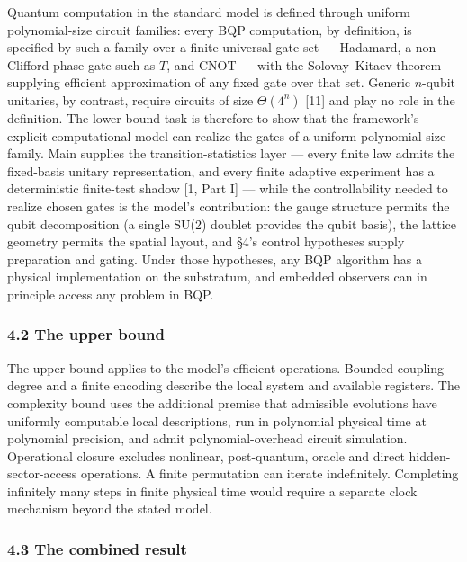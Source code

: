 \documentclass[
]{article}
\begin{document}
Quantum computation in the standard model is defined through uniform
polynomial-size circuit families: every BQP computation, by definition,
is specified by such a family over a finite universal gate set ---
Hadamard, a non-Clifford phase gate such as \(T\), and CNOT --- with the
Solovay--Kitaev theorem supplying efficient approximation of any fixed
gate over that set. Generic \(n\)-qubit unitaries, by contrast, require
circuits of size \(\Theta(4^n)\) {[}11{]} and play no role in the
definition. The lower-bound task is therefore to show that the
framework's explicit computational model can realize the gates of a
uniform polynomial-size family. Main supplies the transition-statistics
layer --- every finite law admits the fixed-basis unitary
representation, and every finite adaptive experiment has a deterministic
finite-test shadow {[}1, Part I{]} --- while the controllability needed
to realize chosen gates is the model's contribution: the gauge structure
permits the qubit decomposition (a single SU(2) doublet provides the
qubit basis), the lattice geometry permits the spatial layout, and §4's
control hypotheses supply preparation and gating. Under those
hypotheses, any BQP algorithm has a physical implementation on the
substratum, and embedded observers can in principle access any problem
in BQP.

\hypertarget{the-upper-bound}{%
\subsubsection{4.2 The upper bound}\label{the-upper-bound}}

The upper bound applies to the model's efficient operations. Bounded
coupling degree and a finite encoding describe the local system and
available registers. The complexity bound uses the additional premise
that admissible evolutions have uniformly computable local descriptions,
run in polynomial physical time at polynomial precision, and admit
polynomial-overhead circuit simulation. Operational closure excludes
nonlinear, post-quantum, oracle and direct hidden-sector-access
operations. A finite permutation can iterate indefinitely. Completing
infinitely many steps in finite physical time would require a separate
clock mechanism beyond the stated model.

\hypertarget{the-combined-result}{%
\subsubsection{4.3 The combined result}\label{the-combined-result}}
\end{document}
